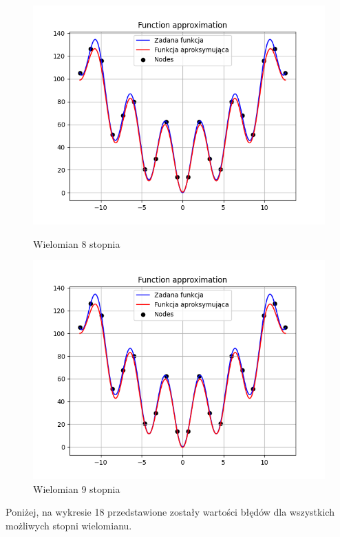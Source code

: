 \documentclass{article}
\begin{document}
\begin{figure}[H]
\begin{minipage}[b]{0.49\textwidth}
    \begin{minipage}[b]{\textwidth}
      \includegraphics[width=\textwidth]{img16.png}
      \caption{Wielomian 8 stopnia}
    \end{minipage}
    \vspace*{\fill}
    \begin{minipage}[b]{\textwidth}
      \includegraphics[width=\textwidth]{img17.png}
      \caption{Wielomian 9 stopnia}
    \end{minipage}
  \end{minipage}
\end{figure}

\noindent
Poniżej, na wykresie 18 przedstawione zostały wartości błędów dla wszystkich możliwych stopni wielomianu.
\end{document}
